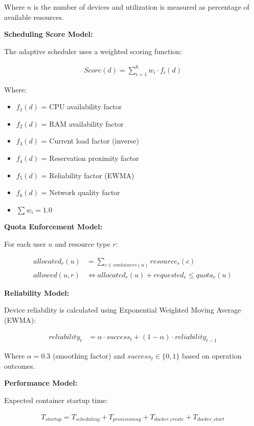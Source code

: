 \documentclass[12pt,a4paper]{article}
\begin{document}
Where $n$ is the number of devices and utilization is measured as percentage of available resources.

\textbf{Scheduling Score Model:}

The adaptive scheduler uses a weighted scoring function:

\begin{align*}
Score(d) = \sum_{i=1}^{6} w_i \cdot f_i(d)
\end{align*}

Where:
\begin{itemize}
    \item $f_1(d)$ = CPU availability factor
    \item $f_2(d)$ = RAM availability factor
    \item $f_3(d)$ = Current load factor (inverse)
    \item $f_4(d)$ = Reservation proximity factor
    \item $f_5(d)$ = Reliability factor (EWMA)
    \item $f_6(d)$ = Network quality factor
    \item $\sum w_i = 1.0$
\end{itemize}
\textbf{Quota Enforcement Model:}

For each user $u$ and resource type $r$:

\begin{align*}
allocated_r(u) &= \sum_{c \in containers(u)} resource_r(c) \\
allowed(u,r) &\Leftrightarrow allocated_r(u) + requested_r \leq quota_r(u)
\end{align*}

\textbf{Reliability Model:}

Device reliability is calculated using Exponential Weighted Moving Average (EWMA):

\begin{align*}
reliability_t &= \alpha \cdot success_t + (1-\alpha) \cdot reliability_{t-1}
\end{align*}

Where $\alpha = 0.3$ (smoothing factor) and $success_t \in \{0,1\}$ based on operation outcomes.

\textbf{Performance Model:}

Expected container startup time:

\begin{align*}
T_{startup} = T_{scheduling} + T_{provisioning} + T_{docker\_create} + T_{docker\_start}
\end{align*}
\end{document}
